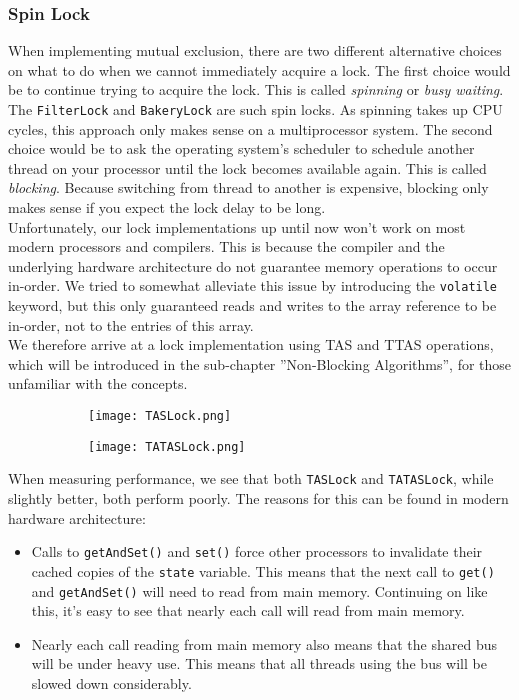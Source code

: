 \documentclass[main]{subfiles}
\begin{document}
\subsubsection{Spin Lock}
When implementing mutual exclusion, there are two different alternative choices on what to do when we cannot immediately acquire a lock. The first choice would be to continue trying to acquire the lock. This is called \textit{spinning} or \textit{busy waiting}. The \texttt{FilterLock} and \texttt{BakeryLock} are such spin locks. As spinning takes up CPU cycles, this approach only makes sense on a multiprocessor system. The second choice would be to ask the operating system's scheduler to schedule another thread on your processor until the lock becomes available again. This is called \textit{blocking}. Because switching from thread to another is expensive, blocking only makes sense if you expect the lock delay to be long.\\[3mm]
Unfortunately, our lock implementations up until now won't work on most modern processors and compilers. This is because the compiler and the underlying hardware architecture do not guarantee memory operations to occur in-order. We tried to  somewhat alleviate this issue by introducing the \texttt{volatile} keyword, but this only guaranteed reads and writes to the array reference to be in-order, not to the entries of this array.\\[3mm]
We therefore arrive at a lock implementation using TAS and TTAS operations, which will be introduced in the sub-chapter ''Non-Blocking Algorithms'', for those unfamiliar with the concepts.
\begin{figure}[h]
    \centering
    \begin{subfigure}{.5\textwidth}
        \centering
        \texttt{[image: TASLock.png]}
    \end{subfigure}%
    \begin{subfigure}{.5\textwidth}
        \centering
        \texttt{[image: TATASLock.png]}
    \end{subfigure}
\end{figure}
When measuring performance, we see that both \texttt{TASLock} and \texttt{TATASLock}, while slightly better, both perform poorly. The reasons for this can be found in modern hardware architecture:
\begin{itemize}
    \item Calls to \texttt{getAndSet()} and \texttt{set()} force other processors to invalidate their cached copies of the \texttt{state} variable. This means that the next call to \texttt{get()} and \texttt{getAndSet()} will need to read from main memory. Continuing on like this, it's easy to see that nearly each call will read from main memory.
    \item Nearly each call reading from main memory also means that the shared bus will be under heavy use. This means that all threads using the bus will be slowed down considerably.
\end{itemize}
\end{document}
